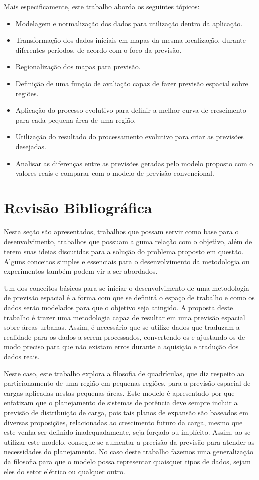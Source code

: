 Mais especificamente, este trabalho aborda os seguintes tópicos:
\begin{itemize}
\item Modelagem e normalização dos dados para utilização dentro da aplicação.
\item Transformação dos dados iniciais em mapas da mesma localização, durante diferentes períodos, de acordo com o foco da previsão.
\item Regionalização dos mapas para previsão.
\item Definição de uma função de avaliação capaz de fazer previsão espacial sobre regiões.
\item Aplicação do processo evolutivo para definir a melhor curva de crescimento para cada pequena área de uma região.
\item Utilização do resultado do processamento evolutivo para criar as previsões desejadas.
\item Analisar as diferenças entre as previsões geradas pelo modelo proposto com o valores reais e comparar com o modelo de previsão convencional. 
\end{itemize}

\section{Revisão Bibliográfica}
Nesta seção são apresentados, trabalhos que possam servir como base para o desenvolvimento, trabalhos que possuam alguma relação com o objetivo, além de terem suas ideias discutidas para a solução do problema proposto em questão. Alguns conceitos simples e essenciais para o desenvolvimento da metodologia ou experimentos também podem vir a ser abordados.

Um dos conceitos básicos para se iniciar o desenvolvimento de uma metodologia de previsão espacial é a forma com que se definirá o espaço de trabalho e como os dados serão modelados para que o objetivo seja atingido. A proposta deste trabalho é trazer uma metodologia capaz de resultar em uma previsão espacial sobre áreas urbanas. Assim, é necessário que se utilize dados que traduzam a realidade para os dados a serem processados, convertendo-os e ajustando-os de modo preciso para que não existam erros durante a aquisição e tradução dos dados reais.

Neste caso, este trabalho explora a filosofia de quadrículas, que diz respeito ao particionamento de uma região em pequenas regiões, para a previsão espacial de cargas aplicadas nestas pequenas áreas. Este modelo é apresentado por \citeauthor{willis2002spatial} \cite{willis2002spatial} que enfatizam que o planejamento de sistemas de potência deve sempre incluir a previsão de distribuição de carga, pois tais planos de expansão são baseados em diversas proposições, relacionadas ao crescimento futuro da carga, mesmo que este venha ser definido inadequadamente, seja forçado ou implícito. Assim, ao se utilizar este modelo, consegue-se aumentar a precisão da previsão para atender as necessidades do planejamento. No caso deste trabalho fazemos uma generalização da filosofia para que o modelo possa representar quaisquer tipos de dados, sejam eles do setor elétrico ou qualquer outro.

